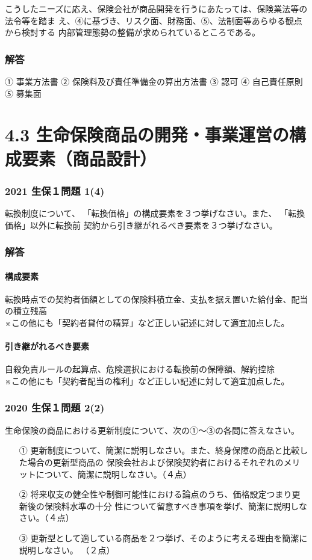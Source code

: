 \documentclass[report,gutter=10mm,fore-edge=10mm,uplatex,dvipdfmx]{jlreq}
\begin{document}
こうしたニーズに応え、保険会社が商品開発を行うにあたっては、保険業法等の法令等を踏ま
え、④に基づき、リスク面、財務面、⑤、法制面等あらゆる観点から検討する
内部管理態勢の整備が求められているところである。
\subsubsection{解答}
① 事業方法書
② 保険料及び責任準備金の算出方法書
③ 認可
④ 自己責任原則
⑤ 募集面

\section{4.3 生命保険商品の開発・事業運営の構成要素（商品設計）}

\subsubsection{2021 生保１問題 1(4)}
転換制度について、
「転換価格」の構成要素を３つ挙げなさい。また、
「転換価格」以外に転換前
契約から引き継がれるべき要素を３つ挙げなさい。

\subsubsection{解答}
\paragraph{構成要素}
転換時点での契約者価額としての保険料積立金、支払を据え置いた給付金、配当の積立残高\\
※この他にも「契約者貸付の精算」など正しい記述に対して適宜加点した。
\paragraph{引き継がれるべき要素}
自殺免責ルールの起算点、危険選択における転換前の保障額、解約控除\\
※この他にも「契約者配当の権利」など正しい記述に対して適宜加点した。

\subsubsection{2020 生保１問題 2(2)}

生命保険の商品における更新制度について、次の①～③の各問に答えなさい。
\begin{enumerate}
 \item [①] 更新制度について、簡潔に説明しなさい。また、終身保障の商品と比較した場合の更新型商品の
 保険会社および保険契約者におけるそれぞれのメリットについて、簡潔に説明しなさい。（４点）
 \item [②] 将来収支の健全性や制御可能性における論点のうち、価格設定つまり更新後の保険料水準の十分
 性について留意すべき事項を挙げ、簡潔に説明しなさい。（４点）
 \item [③] 更新型として適している商品を２つ挙げ、そのように考える理由を簡潔に説明しなさい。 （２点）
\end{enumerate}
\end{document}
